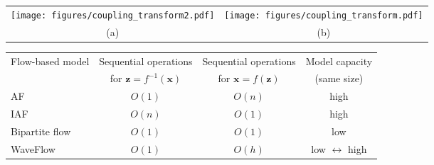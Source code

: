 \documentclass{article}
\newcommand{\vv}[1]{\boldsymbol{#1}}
\begin{document}
\begin{figure*}[t] \centering
\begin{tabular}{cc}
\hspace{-.4cm}
\texttt{[image: figures/coupling\_transform2.pdf]} 
&
\hspace{1.3cm}
\texttt{[image: figures/coupling\_transform.pdf]} 
\\
\vspace{-.7em}
{\hspace{-.5em} \small (a)}  & \hspace{1.2cm} {\small(b)}
\\
\end{tabular}
\vspace{-.8em}
\caption{The Jacobian $\frac{\partial f^{-1}(\vv x) }{\partial \vv x}$ of (a) an autoregressive transformation, and (b) a bipartite transformation.
The blank cells are zeros and represent the independent relations between $z_i$ and $x_{j}$.
The light-blue cells with scaling variables $\sigma$ represent the linear dependencies.
The dark-blue cells represent complex non-linear dependencies.}
\vspace{-.7em}
\label{fig:Jacobian} \end{figure*}
\begin{table*}[t!]
\centering
\vspace{-.3em}
\caption{The minimum number of sequential operations~(indicates parallelism) required by flow-based models for density evaluation $\vv z = f^{-1}(\vv x)$ and sampling $\vv x = f(\vv z)$. Therein, $n$ is the length of $\vv x$, $h$ is the squeezed height in WaveFlow. In WaveFlow, larger $h$ leads to higher model capacity, but more sequential steps for sampling.}
\vspace{0.2em}
\begin{tabular}{l|c|c|c}
\hline 
\multirow{2}{8.5em}{Flow-based model}  &  Sequential operations & Sequential operations & Model capacity \\
& for $\vv z = f^{-1}(\vv x)$ & for $\vv x = f(\vv z)$ & (same size)
\\ \hline
AF & $O(1)$ & $O(n)$ & high  \\ 
IAF  & $O(n)$ & $O(1)$ & high \\ 
Bipartite flow  & $O(1)$ & $O(1)$ & low  \\
WaveFlow & $O(1)$ & $O(h)$ & low $\leftrightarrow$ high \\ 
\hline
\end{tabular}
\label{tab:summary_flow}
\end{table*}
\end{document}
